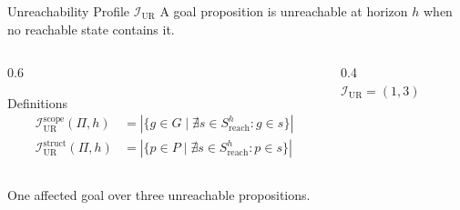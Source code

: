 \begin{frame}{Unreachability Profile $\mathcal{I}_{\text{UR}}$}
    A goal proposition is unreachable at horizon $h$ when no reachable state contains it.

    \begin{columns}[T]
        \begin{column}{0.6\textwidth}
            \begin{block}{Definitions}
                \footnotesize
                \begin{align*}
                    \mathcal{I}^{\text{scope}}_{\text{UR}}(\Pi, h)  & = |\{g \in G \mid \nexists s \in S^h_{\text{reach}} : g \in s\}| \\
                    \mathcal{I}^{\text{struct}}_{\text{UR}}(\Pi, h) & = |\{p \in P \mid \nexists s \in S^h_{\text{reach}} : p \in s\}|
                \end{align*}
            \end{block}
        \end{column}
        \begin{column}{0.4\textwidth}
            \centering
            \\[2pt]
            {\small $\mathcal{I}_{\text{UR}} = (1, 3)$}
        \end{column}
    \end{columns}

    One affected goal over three unreachable propositions.

\end{frame}

